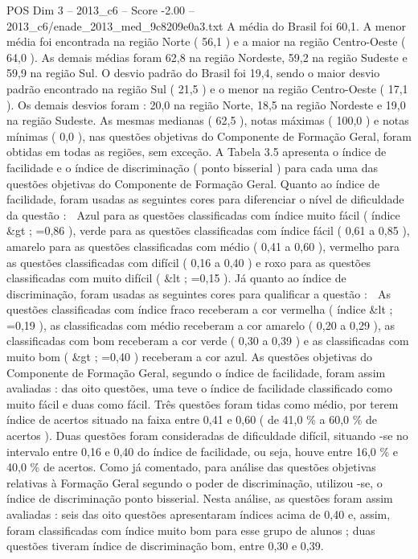 \begin{textsample}{POS Dim 3 – 2013\_c6 – Score -2.00 – 2013\_c6/enade\_2013\_med\_9c8209e0a3.txt}
A média do Brasil foi 60,1.
A menor média foi encontrada na região Norte ( 56,1 ) e a maior na região Centro-Oeste ( 64,0 ).
As demais médias foram 62,8 na região Nordeste, 59,2 na região Sudeste e 59,9 na região Sul.
O desvio padrão do Brasil foi 19,4, sendo o maior desvio padrão encontrado na região Sul ( 21,5 ) e o menor na região Centro-Oeste ( 17,1 ).
Os demais desvios foram : 20,0 na região Norte, 18,5 na região Nordeste e 19,0 na região Sudeste.
As mesmas medianas ( 62,5 ), notas máximas ( 100,0 ) e notas mínimas ( 0,0 ), nas questões objetivas do Componente de Formação Geral, foram obtidas em todas as regiões, sem exceção.
A Tabela 3.5 apresenta o índice de facilidade e o índice de discriminação ( ponto bisserial ) para cada uma das questões objetivas do Componente de Formação Geral.
Quanto ao índice de facilidade, foram usadas as seguintes cores para diferenciar o nível de dificuldade da questão :  Azul para as questões classificadas com índice muito fácil ( índice \&gt ; =0,86 ), verde para as questões classificadas com índice fácil ( 0,61 a 0,85 ), amarelo para as questões classificadas com médio ( 0,41 a 0,60 ), vermelho para as questões classificadas com difícil ( 0,16 a 0,40 ) e roxo para as questões classificadas com muito difícil ( \&lt ; =0,15 ).
Já quanto ao índice de discriminação, foram usadas as seguintes cores para qualificar a questão :  As questões classificadas com índice fraco receberam a cor vermelha ( índice \&lt ; =0,19 ), as classificadas com médio receberam a cor amarelo ( 0,20 a 0,29 ), as classificadas com bom receberam a cor verde ( 0,30 a 0,39 ) e as classificadas com muito bom ( \&gt ; =0,40 ) receberam a cor azul.
As questões objetivas do Componente de Formação Geral, segundo o índice de facilidade, foram assim avaliadas : das oito questões, uma teve o índice de facilidade classificado como muito fácil e duas como fácil.
Três questões foram tidas como médio, por terem índice de acertos situado na faixa entre 0,41 e 0,60 ( de 41,0 \% a 60,0 \% de acertos ).
Duas questões foram consideradas de dificuldade difícil, situando -se no intervalo entre 0,16 e 0,40 do índice de facilidade, ou seja, houve entre 16,0 \% e 40,0 \% de acertos.
Como já comentado, para análise das questões objetivas relativas à Formação Geral segundo o poder de discriminação, utilizou -se, o índice de discriminação ponto bisserial.
Nesta análise, as questões foram assim avaliadas : seis das oito questões apresentaram índices acima de 0,40 e, assim, foram classificadas com índice muito bom para esse grupo de alunos ; duas questões tiveram índice de discriminação bom, entre 0,30 e 0,39.

\end{textsample}
